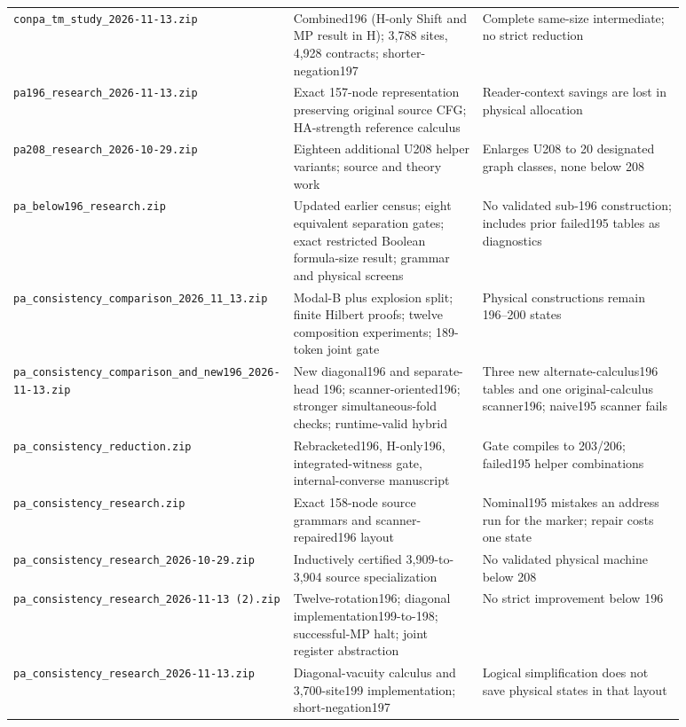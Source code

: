 \begin{longtable}{@{}>{\raggedright\arraybackslash}p{0.29\linewidth}>{\raggedright\arraybackslash}p{0.29\linewidth}>{\raggedright\arraybackslash}p{0.3\linewidth}@{}}
\nolinkurl{conpa_tm_study_2026-11-13.zip} & Combined196 (H-only Shift and MP result in H); 3,788 sites, 4,928 contracts; shorter-negation197 & Complete same-size intermediate; no strict reduction\\
\nolinkurl{pa196_research_2026-11-13.zip} & Exact 157-node representation preserving original source CFG; HA-strength reference calculus & Reader-context savings are lost in physical allocation\\
\nolinkurl{pa208_research_2026-10-29.zip} & Eighteen additional U208 helper variants; source and theory work & Enlarges U208 to 20 designated graph classes, none below 208\\
\nolinkurl{pa_below196_research.zip} & Updated earlier census; eight equivalent separation gates; exact restricted Boolean formula-size result; grammar and physical screens & No validated sub-196 construction; includes prior failed195 tables as diagnostics\\
\nolinkurl{pa_consistency_comparison_2026_11_13.zip} & Modal-B plus explosion split; finite Hilbert proofs; twelve composition experiments; 189-token joint gate & Physical constructions remain 196--200 states\\
\nolinkurl{pa_consistency_comparison_and_new196_2026-11-13.zip} & New diagonal196 and separate-head 196; scanner-oriented196; stronger simultaneous-fold checks; runtime-valid hybrid & Three new alternate-calculus196 tables and one original-calculus scanner196; naive195 scanner fails\\
\nolinkurl{pa_consistency_reduction.zip} & Rebracketed196, H-only196, integrated-witness gate, internal-converse manuscript & Gate compiles to 203/206; failed195 helper combinations\\
\nolinkurl{pa_consistency_research.zip} & Exact 158-node source grammars and scanner-repaired196 layout & Nominal195 mistakes an address run for the marker; repair costs one state\\
\nolinkurl{pa_consistency_research_2026-10-29.zip} & Inductively certified 3,909-to-3,904 source specialization & No validated physical machine below 208\\
\nolinkurl{pa_consistency_research_2026-11-13 (2).zip} & Twelve-rotation196; diagonal implementation199-to-198; successful-MP halt; joint register abstraction & No strict improvement below 196\\
\nolinkurl{pa_consistency_research_2026-11-13.zip} & Diagonal-vacuity calculus and 3,700-site199 implementation; short-negation197 & Logical simplification does not save physical states in that layout\\

\end{longtable}
